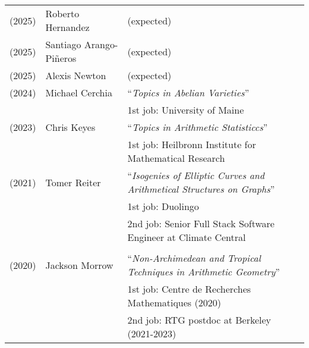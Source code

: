 \documentclass[margin,line]{res}
\newcommand{\defi}[1]{\textsf{#1}} 				%
\begin{document}
\begin{resume}
\begin{tabular}{lll}
  (2025) & \defi{Roberto Hernandez} & (expected)
    \vspace{4pt}\\    
  (2025) & \defi{Santiago Arango-Pi\~neros} & (expected)
    \vspace{4pt}\\  
  (2025) & \defi{Alexis Newton} & (expected)
    \vspace{4pt}\\
  (2024) & \defi{Michael Cerchia} &``\emph{Topics in Abelian Varieties}'' \\
         && \hspace{4 pt} 1st job: University of Maine
    \vspace{4pt}\\
  (2023) & \defi{Chris Keyes} &  ``\emph{Topics in Arithmetic Statisticcs}'' \\
         && \hspace{4 pt} 1st job: Heilbronn Institute for Mathematical Research
         \vspace{4pt}\\
  (2021) & \defi{Tomer Reiter} &  ``\emph{Isogenies of Elliptic Curves and Arithmetical Structures on Graphs}'' \\
           && \hspace{4 pt} 1st job: Duolingo\\
         && \hspace{4 pt} 2nd job: Senior Full Stack Software Engineer at Climate Central      \\         
    \vspace{4pt}\\ 
  (2020) & \defi{Jackson Morrow} &  ``\emph{Non-Archimedean and Tropical Techniques in Arithmetic Geometry}'' \\
         && \hspace{4 pt} 1st job: Centre de Recherches Mathematiques (2020)\\
         &&  \hspace{4 pt} 2nd job: RTG postdoc at Berkeley (2021-2023)\\

\end{tabular}
\end{resume}
\end{document}
